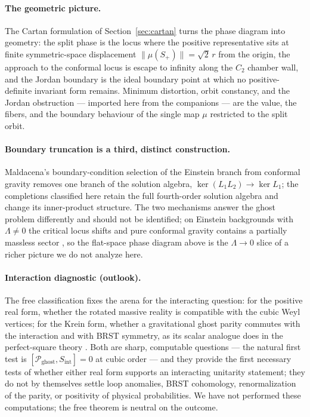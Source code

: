 \documentclass[11pt]{article}
\theoremstyle{definition}
\theoremstyle{remark}
\begin{document}
\paragraph{The geometric picture.}
The Cartan formulation of Section~\ref{sec:cartan} turns the phase
diagram into geometry: the split phase is the locus where the positive
representative sits at finite symmetric-space displacement
$\|\mu(S_+)\|=\sqrt2\,r$ from the origin, the approach to the conformal
locus is escape to infinity along the $C_2$ chamber wall, and the Jordan
boundary is the ideal boundary point at which no positive-definite
invariant form remains.  Minimum distortion, orbit constancy, and the
Jordan obstruction --- imported here from the companions --- are the
value, the fibers, and the boundary behaviour of the single map $\mu$
restricted to the split orbit.

\paragraph{Boundary truncation is a third, distinct construction.}
Maldacena's boundary-condition selection of the Einstein branch from
conformal gravity \cite{Maldacena} removes one branch of the solution
algebra, $\ker(L_1L_2)\to\ker L_1$; the completions classified here retain
the full fourth-order solution algebra and change its inner-product
structure.  The two mechanisms answer the ghost problem differently and
should not be identified; on Einstein backgrounds with $\Lambda\neq0$ the
critical locus shifts \cite{LuPope} and pure conformal gravity contains a
partially massless sector \cite{DeserWaldron}, so the flat-space phase
diagram above is the $\Lambda\to0$ slice of a richer picture we do not
analyze here.

\paragraph{Interaction diagnostic (outlook).}
The free classification fixes the arena for the interacting question: for
the positive real form, whether the rotated massive reality is compatible
with the cubic Weyl vertices; for the Krein form, whether a gravitational
ghost parity commutes with the interaction and with BRST symmetry, as its
scalar analogue does in the perfect-square theory \cite{BT2026}.  Both are
sharp, computable questions --- the natural first test is
$[\mathcal P_{\mathrm{ghost}},S_{\mathrm{int}}]=0$ at cubic order --- and
they provide the first necessary tests of whether either real form
supports an interacting unitarity statement; they do not by themselves
settle loop anomalies, BRST cohomology, renormalization of the parity, or
positivity of physical probabilities.  We have not performed these
computations; the free theorem is neutral on the outcome.
\end{document}
